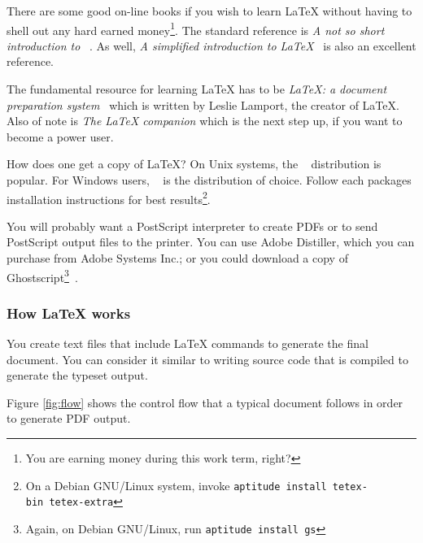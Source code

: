 \documentclass{uw-wkrpt}
\begin{document}
There are some good on-line books if you wish to learn \LaTeX{} without
having to shell out any hard earned money\footnote{You are earning money
during this work term, right?}.  The standard reference is \textit{A
not so short introduction to \LaTeXe{}}~\cite{ref:short}.  As well,
\textit{A simplified introduction to \LaTeX}~\cite{ref:simplified} is
also an excellent reference.

The fundamental resource for learning \LaTeX{} has to be \textit{\LaTeX:
a document preparation system}~\cite{ref:latex2e} which is written by
Leslie Lamport, the creator of \LaTeX.  Also of note is \textit{The
\LaTeX{} companion} which is the next step up, if you want to become a
power user.

How does one get a copy of \LaTeX?  On Unix systems, the 
\teTeX~\cite{ref:tetex} distribution is popular.  For Windows users,
\MiKTeX~\cite{ref:miktex} is the distribution of choice.  Follow each
packages installation instructions for best results\footnote{On a Debian
GNU/Linux system, invoke \texttt{aptitude~install~tetex-bin~tetex-extra}}.

You will probably want a PostScript interpreter to create PDFs or to
send PostScript output files to the printer.  You can use Adobe Distiller,
which you can purchase from Adobe Systems Inc.; or you could download
a copy of Ghostscript\footnote{Again, on Debian GNU/Linux, run
\texttt{aptitude~install~gs}}~\cite{ref:gs}.

\subsubsection{How \LaTeX{} works}

You create text files that include \LaTeX{} commands to generate the
final document.  You can consider it similar to writing source code
that is compiled to generate the typeset output.

Figure \ref{fig:flow} shows the control flow that a typical document
follows in order to generate PDF output.
\end{document}
